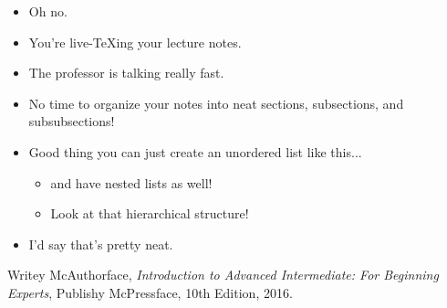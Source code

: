 \documentclass[twoside]{amsart}
\theoremstyle{plain} %
\theoremstyle{definition}
\theoremstyle{remark}
\begin{document}
	\begin{itemize}
		\item Oh no.
		\item You're live-TeXing your lecture notes.
		\item The professor is talking really fast.
		\item No time to organize your notes into neat sections, subsections, and subsubsections!
		\item Good thing you can just create an unordered list like this...
		\begin{itemize}
			\item and have nested lists as well!
			\item Look at that hierarchical structure!
		\end{itemize}
		\item I'd say that's pretty neat.
	\end{itemize}
	
	\clearpage
	
	\begin{thebibliography}{"McAuthorface16"}
		Writey McAuthorface,
		\emph{Introduction to Advanced Intermediate: For Beginning Experts},
		Publishy McPressface,
		10th Edition,
		2016.
	\end{thebibliography}
	
	\vfill  %
	
\end{document}
